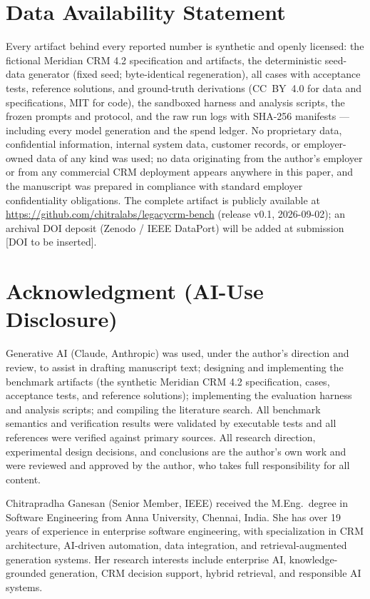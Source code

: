 \documentclass{ieeetj}
\begin{document}
\section*{Data Availability Statement}
Every artifact behind every reported number is synthetic and openly licensed: the fictional
Meridian CRM 4.2 specification and artifacts, the deterministic seed-data generator (fixed
seed; byte-identical regeneration), all \NumCases{} cases with acceptance tests, reference
solutions, and ground-truth derivations (CC~BY~4.0 for data and specifications, MIT for
code), the sandboxed harness and analysis scripts, the frozen prompts and protocol, and the
raw run logs with SHA-256 manifests --- including every model generation and the spend
ledger. No proprietary data, confidential information, internal system data, customer
records, or employer-owned data of any kind was used; no data originating from the author's
employer or from any commercial CRM deployment appears anywhere in this paper, and the
manuscript was prepared in compliance with standard employer confidentiality obligations.
The complete artifact is publicly available at \url{https://github.com/chitralabs/legacycrm-bench} (release v0.1, 2026-09-02);
an archival DOI deposit (Zenodo / IEEE DataPort) will be added at submission
[DOI to be inserted].

\section*{Acknowledgment (AI-Use Disclosure)}
Generative AI (Claude, Anthropic) was used, under the author's direction and review, to
assist in drafting manuscript text; designing and implementing the benchmark artifacts (the
synthetic Meridian CRM 4.2 specification, cases, acceptance tests, and reference solutions);
implementing the evaluation harness and analysis scripts; and compiling the literature
search. All benchmark semantics and verification results were validated by executable tests
and all references were verified against primary sources. All research direction,
experimental design decisions, and conclusions are the author's own work and were reviewed
and approved by the author, who takes full responsibility for all content.




\begin{IEEEbiographynophoto}{Chitrapradha Ganesan}
(Senior Member, IEEE) received the M.Eng.\ degree in Software Engineering from Anna
University, Chennai, India. She has over 19 years of experience in enterprise software
engineering, with specialization in CRM architecture, AI-driven automation, data
integration, and retrieval-augmented generation systems. Her research interests include
enterprise AI, knowledge-grounded generation, CRM decision support, hybrid retrieval, and
responsible AI systems.
\end{IEEEbiographynophoto}
\end{document}
